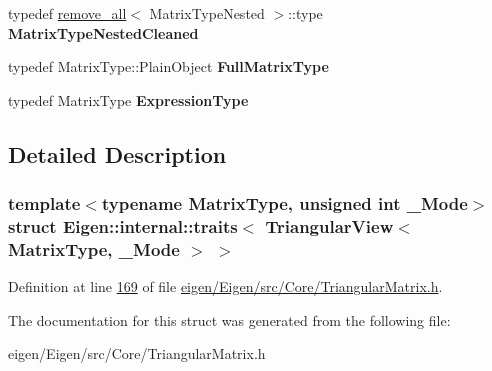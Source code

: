 \begin{DoxyCompactItemize}
typedef \hyperlink{struct_eigen_1_1internal_1_1remove__all}{remove\+\_\+all}$<$ Matrix\+Type\+Nested $>$\+::type {\bfseries Matrix\+Type\+Nested\+Cleaned}
\item 
\mbox{\label{struct_eigen_1_1internal_1_1traits_3_01_triangular_view_3_01_matrix_type_00_01___mode_01_4_01_4_ae095786a046526775ef19b7e9e081acd}} 
typedef Matrix\+Type\+::\+Plain\+Object {\bfseries Full\+Matrix\+Type}
\item 
\mbox{\label{struct_eigen_1_1internal_1_1traits_3_01_triangular_view_3_01_matrix_type_00_01___mode_01_4_01_4_a1d0a29012b48a59e2376f4154db5130d}} 
typedef Matrix\+Type {\bfseries Expression\+Type}
\end{DoxyCompactItemize}


\subsection{Detailed Description}
\subsubsection*{template$<$typename Matrix\+Type, unsigned int \+\_\+\+Mode$>$\newline
struct Eigen\+::internal\+::traits$<$ Triangular\+View$<$ Matrix\+Type, \+\_\+\+Mode $>$ $>$}



Definition at line \hyperlink{eigen_2_eigen_2src_2_core_2_triangular_matrix_8h_source_l00169}{169} of file \hyperlink{eigen_2_eigen_2src_2_core_2_triangular_matrix_8h_source}{eigen/\+Eigen/src/\+Core/\+Triangular\+Matrix.\+h}.



The documentation for this struct was generated from the following file\+:\begin{DoxyCompactItemize}
\item 
eigen/\+Eigen/src/\+Core/\+Triangular\+Matrix.\+h\end{DoxyCompactItemize}
